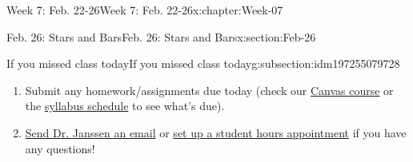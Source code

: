 \documentclass[oneside,10pt,]{book}
\numberwithin{equation}{section}
\begin{document}
\begin{chapterptx}{Week 7: Feb. 22-26}{}{Week 7: Feb. 22-26}{}{}{x:chapter:Week-07}
\begin{sectionptx}{Feb. 26: Stars and Bars}{}{Feb. 26: Stars and Bars}{}{}{x:section:Feb-26}
\begin{subsectionptx}{If you missed class today}{}{If you missed class today}{}{}{g:subsection:idm197255079728}
\begin{enumerate}
\item{}Submit any homework\slash{}assignments due today (check our \href{https://dordt.instructure.com/courses/3110050}{Canvas course} or the \href{https://prof.mkjanssen.org/ds/index.html\#schedule}{syllabus schedule} to see what's due).%
\item{}\href{mailto:mike.janssen@dordt.edu}{Send Dr. Janssen an email} or \href{https://calendly.com/mkjanssen/student-hours}{set up a student hours appointment} if you have any questions!%
\end{enumerate}
\end{subsectionptx}
\end{sectionptx}
\end{chapterptx}
%
%
\typeout{************************************************}
\typeout{************************************************}
%
\end{document}
